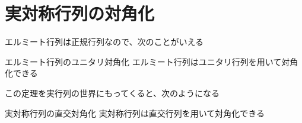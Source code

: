 \documentclass[../../../topic_linear-algebra]{subfiles}
\begin{document}
\sectionline
\section{実対称行列の対角化}

エルミート行列は正規行列なので、次のことがいえる

\begin{theorem*}{エルミート行列のユニタリ対角化}
  エルミート行列はユニタリ行列を用いて対角化できる
\end{theorem*}

この定理を実行列の世界にもってくると、次のようになる

\begin{theorem*}{実対称行列の直交対角化}
  実対称行列は直交行列を用いて対角化できる
\end{theorem*}
\end{document}
